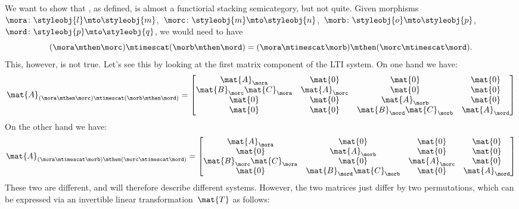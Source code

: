 \begin{example}
    We want to show that \LTI, as defined, is almost a functiorial stacking semicategory, but not quite.
    Given morphisms~$\mora\colon \styleobj{l}\mto \styleobj{m}$,~$\morc\colon \styleobj{m}\mto \styleobj{n}$,~$\morb\colon \styleobj{o}\mto \styleobj{p}$,~$\mord\colon \styleobj{p}\mto \styleobj{q}$, we would need to have
    \begin{equation*}
        (\mora \mthen \morc)\mtimescat (\morb\mthen \mord)=(\mora\mtimescat \morb)\mthen (\morc\mtimescat \mord).
    \end{equation*}
    This, however, is not true.
    Let's see this by looking at the first matrix component of the LTI system.
    On one hand we have:
    \begin{equation*}
        \mat{A}_{(\mora \mthen \morc)\mtimescat (\morb\mthen \mord)}=
        \begin{bmatrix}
            \mat{A}_\mora              & \mat{0}       & \mat{0}                    & \mat{0}       \\
            \mat{B}_\morc\mat{C}_\mora & \mat{A}_\morc & \mat{0}                    & \mat{0}       \\
            \mat{0}                    & \mat{0}       & \mat{A}_\morb              & \mat{0}       \\
            \mat{0}                    & \mat{0}       & \mat{B}_\mord\mat{C}_\morb & \mat{A}_\mord
        \end{bmatrix}
    \end{equation*}
    On the other hand we have:
    \begin{equation*}
        \mat{A}_{(\mora\mtimescat \morb)\mthen (\morc\mtimescat \mord)}=
        \begin{bmatrix}
            \mat{A}_\mora               & \mat{0}                     & \mat{0}       & \mat{0}       \\
            \mat{0}                     & \mat{A}_\morb               & \mat{0}       & \mat{0}       \\
            \mat{B}_\morc \mat{C}_\mora & \mat{0}                     & \mat{A}_\morc & \mat{0}       \\
            \mat{0}                     & \mat{B}_\mord \mat{C}_\morb & \mat{0}       & \mat{A}_\mord
        \end{bmatrix}
    \end{equation*}
    These two are different, and will therefore describe different systems.
    However, the two matrices just differ by two permutations, which can be expressed via an invertible linear transformation~$\mat{T}$ as follows:

\end{example}

